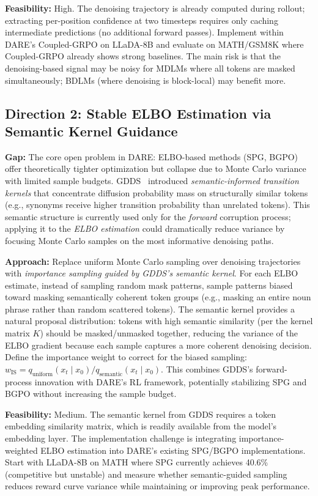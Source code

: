 \documentclass[11pt]{article}
\begin{document}
\textbf{Feasibility:} High. The denoising trajectory is already computed during rollout; extracting per-position confidence at two timesteps requires only caching intermediate predictions (no additional forward passes). Implement within DARE's Coupled-GRPO on LLaDA-8B and evaluate on MATH/GSM8K where Coupled-GRPO already shows strong baselines. The main risk is that the denoising-based signal may be noisy for MDLMs where all tokens are masked simultaneously; BDLMs (where denoising is block-local) may benefit more.

\subsection{Direction 2: Stable ELBO Estimation via Semantic Kernel Guidance}

\textbf{Gap:} The core open problem in DARE: ELBO-based methods (SPG, BGPO) offer theoretically tighter optimization but collapse due to Monte Carlo variance with limited sample budgets. GDDS~\cite{gdds} introduced \textit{semantic-informed transition kernels} that concentrate diffusion probability mass on structurally similar tokens (e.g., synonyms receive higher transition probability than unrelated tokens). This semantic structure is currently used only for the \textit{forward} corruption process; applying it to the \textit{ELBO estimation} could dramatically reduce variance by focusing Monte Carlo samples on the most informative denoising paths.

\textbf{Approach:} Replace uniform Monte Carlo sampling over denoising trajectories with \textit{importance sampling guided by GDDS's semantic kernel}. For each ELBO estimate, instead of sampling random mask patterns, sample patterns biased toward masking semantically coherent token groups (e.g., masking an entire noun phrase rather than random scattered tokens). The semantic kernel provides a natural proposal distribution: tokens with high semantic similarity (per the kernel matrix $K$) should be masked/unmasked together, reducing the variance of the ELBO gradient because each sample captures a more coherent denoising decision. Define the importance weight to correct for the biased sampling:
$w_{\mathrm{IS}} = q_{\mathrm{uniform}}(x_t \mid x_0) / q_{\mathrm{semantic}}(x_t \mid x_0)$.
This combines GDDS's forward-process innovation with DARE's RL framework, potentially stabilizing SPG and BGPO without increasing the sample budget.

\textbf{Feasibility:} Medium. The semantic kernel from GDDS requires a token embedding similarity matrix, which is readily available from the model's embedding layer. The implementation challenge is integrating importance-weighted ELBO estimation into DARE's existing SPG/BGPO implementations. Start with LLaDA-8B on MATH where SPG currently achieves 40.6\% (competitive but unstable) and measure whether semantic-guided sampling reduces reward curve variance while maintaining or improving peak performance.
\end{document}
